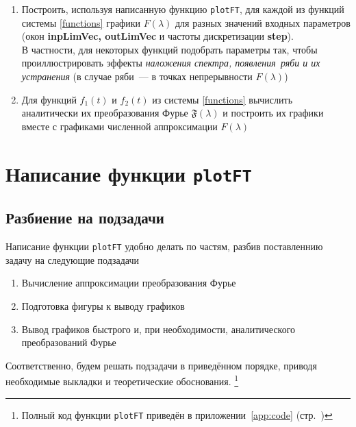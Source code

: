 \documentclass[11pt, oneside, draft]{article}
\numberwithin{equation}{section}
\newcommand \bitem[1][]{
\item \textbf{#1}}
\newcommand \four[1][\lambda]{\mathfrak{F}(#1)}
\newcommand \fft[1][\lambda]{F(#1)}
\begin{document}
\begin{enumerate}
\begin{itemize}
            \begin{equation}
            \label{eq:step}
                step= \dfrac{(b - a)}{nPoints - 1}
            \end{equation}
            \bitem[inpLimVec] ~--- окно \([a, b]\) для функции \(f(t)\) \bitem[outLimVec] ~--- окно для вывода графика преобразования Фурье \(\fft\) 
        \end{itemize}
        \item Построить, используя написанную функцию \texttt{plotFT}, для каждой из функций системы \eqref{functions} графики \(\fft\) для разных значений входных параметров
        (окон \textbf{inpLimVec, outLimVec} и частоты дискретизации \textbf{step}). \\В частности, для некоторых функций подобрать параметры так, чтобы проиллюстрировать эффекты
        \textit{наложения спектра, появления~ряби и их устранения} (в случае ряби~--- в точках непрерывности \(\fft\)) 
        \item Для функций \(f_1(t)\) и \(f_2(t)\) из системы \eqref{functions} вычислить аналитически их преобразования Фурье \(\four\) и построить их графики вместе с графиками численной аппроксимации \(\fft\) 
    \end{enumerate}
    \pagebreak
    \section{Написание функции \texttt{plotFT} } %
    \label{sec:programm}
    \subsection{Разбиение на подзадачи} %
    \label{sub:tasks}
    Написание функции \texttt{plotFT} удобно делать по частям, разбив поставленнию задачу на следующие подзадачи
    \begin{enumerate}
        \item Вычисление аппроксимации преобразования Фурье
        \item Подготовка фигуры к выводу графиков
        \item Вывод графиков быстрого и, при необходимости, аналитического преобразований Фурье 
    \end{enumerate}
    Соответственно, будем решать подзадачи в приведённом порядке, приводя необходимые выкладки и теоретические обоснования.
    \footnote{Полный код функции \texttt{plotFT} приведён в приложении~\ref{app:code} (стр.~\pageref{app:code})}
\end{document}
